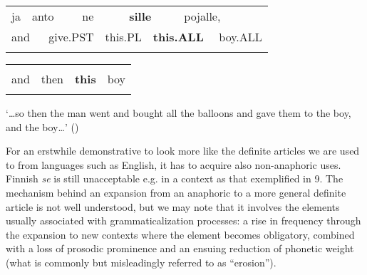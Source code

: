 \begin{tabular}{llllllllll}
\lsptoprule
ja & \multicolumn{2}{l}{anto

} & \multicolumn{2}{l}{ne

} & \multicolumn{2}{l}{{\bfseries sille}

} & \multicolumn{2}{l}{pojalle,

} & \\
\multicolumn{2}{l}{and

} & \multicolumn{2}{l}{give.PST

} & \multicolumn{2}{l}{this.PL

} & \multicolumn{2}{l}{{\bfseries this.ALL}

} & \multicolumn{2}{l}{boy.ALL

}\\
\lspbottomrule
\end{tabular}

\begin{tabular}{llll}
\lsptoprule
\multicolumn{4}{l}{ja

}\\
and & then & {\bfseries this} & boy\\
\lspbottomrule
\end{tabular}

\begin{styleTranslation}
‘…so then the man went and bought all the balloons and gave them to the boy, and the boy…’ (\citet[136]{Juvonen2000})

\end{styleTranslation}

\begin{styleBodyTextFirst}
For an erstwhile demonstrative to look more like the definite articles we are used to from languages such as English, it has to acquire also non-anaphoric uses. Finnish \textit{se }is still unacceptable e.g. in a context as that exemplified in 9. The mechanism behind an expansion from an anaphoric to a more general definite article is not well understood, but we may note that it involves the elements usually associated with grammaticalization processes: a rise in frequency through the expansion to new contexts where the element becomes obligatory, combined with a loss of prosodic prominence and an ensuing reduction of phonetic weight (what is commonly but misleadingly referred to as “erosion”). 

\end{styleBodyTextFirst}

